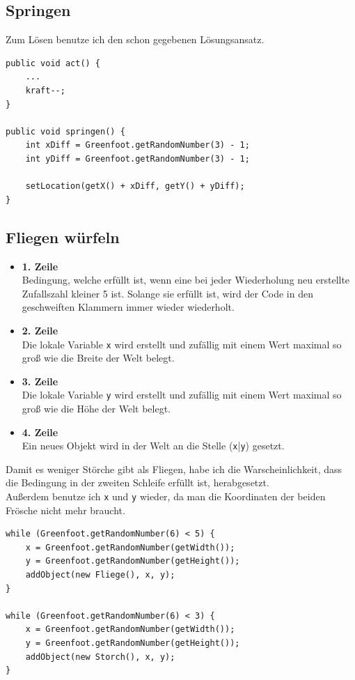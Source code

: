 \documentclass{scrartcl}   %
\begin{document}
\subsection{Springen}

Zum Lösen benutze ich den schon gegebenen Lösungsansatz.\\
\begin{lstlisting}
public void act() {
    ...
    kraft--;
}

public void springen() {
    int xDiff = Greenfoot.getRandomNumber(3) - 1;
    int yDiff = Greenfoot.getRandomNumber(3) - 1;
    
    setLocation(getX() + xDiff, getY() + yDiff);
}
\end{lstlisting}

\subsection{Fliegen würfeln}

\begin{itemize}
    \barrow
    \begin{itemize}
        \item \textbf{1. Zeile}\\
        Bedingung, welche erfüllt ist, wenn eine bei jeder Wiederholung neu erstellte Zufallszahl kleiner 5 ist. Solange sie erfüllt ist, wird der Code in den geschweiften Klammern immer wieder wiederholt.
        \item \textbf{2. Zeile}\\
        Die lokale Variable \texttt{x} wird erstellt und zufällig mit einem Wert maximal so groß wie die Breite der Welt belegt.
        \item \textbf{3. Zeile}\\
        Die lokale Variable \texttt{y} wird erstellt und zufällig mit einem Wert maximal so groß wie die Höhe der Welt belegt.
        \item \textbf{4. Zeile}\\
        Ein neues Objekt wird in der Welt an die Stelle (\texttt{x}|\texttt{y}) gesetzt.
    \end{itemize}
    \barrow Damit es weniger Störche gibt als Fliegen, habe ich die Warscheinlichkeit, dass die Bedingung in der zweiten Schleife erfüllt ist, herabgesetzt.\\
    Außerdem benutze ich \texttt{x} und \texttt{y} wieder, da man die Koordinaten der beiden Frösche nicht mehr braucht.\\
    \begin{lstlisting}
while (Greenfoot.getRandomNumber(6) < 5) {
    x = Greenfoot.getRandomNumber(getWidth());
    y = Greenfoot.getRandomNumber(getHeight());
    addObject(new Fliege(), x, y);
}
    
while (Greenfoot.getRandomNumber(6) < 3) {
    x = Greenfoot.getRandomNumber(getWidth());
    y = Greenfoot.getRandomNumber(getHeight());
    addObject(new Storch(), x, y);
}
    \end{lstlisting}
\end{itemize}
\end{document}
